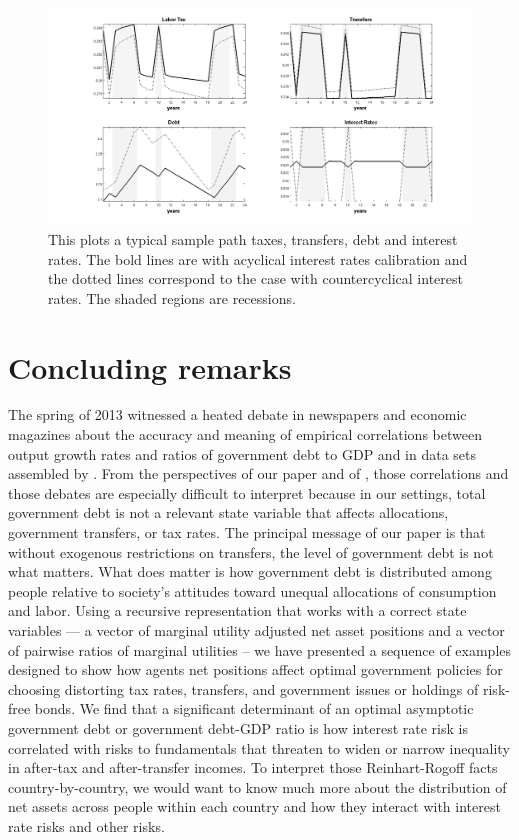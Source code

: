 \documentclass[thmsb,11pt]{article}
\begin{document}
\begin{figure}[htp]
\centering
\includegraphics[width=\textwidth]{Draft25Graphs/DiscoutFactorComparison2.png}
\caption{This plots a typical sample path taxes, transfers, debt and interest rates.  The bold lines  are with acyclical interest rates calibration and the dotted lines correspond to the case with countercyclical interest rates. The shaded regions are recessions.}
\label{fig:DiscoutFactorComparison2}
\end{figure}

\smallskip


\section{Concluding remarks\label{sec:conclude}}

  The spring of 2013 witnessed a heated debate in newspapers and economic magazines about the accuracy and meaning of empirical  correlations between output growth rates and
ratios of government debt to GDP and  in data sets assembled by \cite{Reinhart2010}.
From the  perspectives of our paper and of  \cite{Wer07a}, those correlations and those debates are especially difficult to interpret
because in our settings, total government debt is not a relevant state variable that affects allocations, government transfers, or tax rates.
The principal message of our paper  is that  without exogenous restrictions on transfers, the level of government debt is not what matters. What
 does matter is how government  debt is distributed among people relative to society's attitudes toward unequal allocations of consumption and labor.  Using a recursive representation that works with a correct state variables --- a vector of marginal utility adjusted net asset positions and a vector of pairwise ratios of marginal utilities  --  we have
 presented  a sequence of examples designed to show how  agents net positions affect optimal government policies for choosing distorting tax
 rates, transfers, and government issues or holdings of risk-free bonds. We find that a significant determinant of an optimal asymptotic government
 debt or government debt-GDP ratio is how interest rate risk is correlated with risks to fundamentals that threaten to widen or narrow
 inequality in after-tax and after-transfer incomes. To interpret those Reinhart-Rogoff facts country-by-country, we would
 want to know much more about the distribution of net assets across people within each country and how they interact with interest rate risks and other risks.
\end{document}
